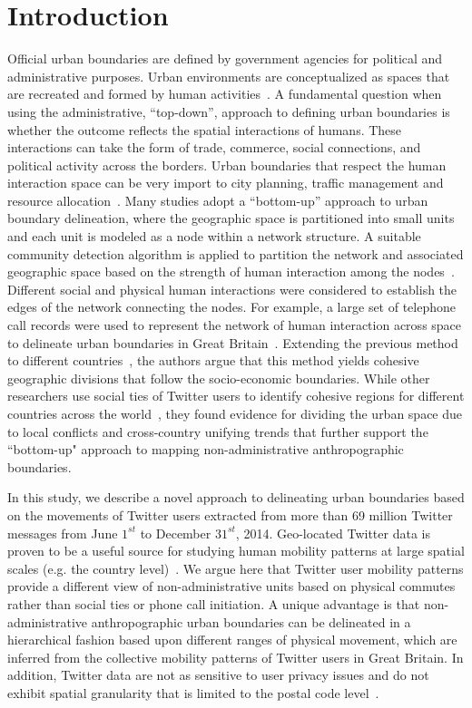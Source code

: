 \documentclass[10pt,letterpaper]{article}
\begin{document}
\section*{Introduction}
Official urban boundaries are defined by government agencies for political and administrative purposes.
Urban environments are conceptualized as spaces that are recreated and formed by human activities~\cite{schliephake}.
A fundamental question when using the administrative, ``top-down'', approach to defining urban boundaries is whether the outcome reflects the spatial interactions of humans.
These interactions can take the form of trade, commerce, social connections, and political activity across the borders.
Urban boundaries that respect the human interaction space can be very import to city planning, traffic management and resource allocation~\cite{lynch1960,jiang2015,liu2015,long2015}.
Many studies adopt a ``bottom-up'' approach to urban boundary delineation, where the geographic space is partitioned into small units and each unit is modeled as a node within a network structure.
A suitable community detection algorithm is applied to partition the network and associated geographic space based on the strength of human interaction among the nodes~\cite{lancichinetti2009}.
Different social and physical human interactions were considered to establish the edges of the network connecting the nodes.
For example, a large set of telephone call records were used to represent the network of human interaction across space to delineate urban boundaries in Great Britain~\cite{ratti2010}.
Extending the previous method to different countries~\cite{sobolevsky2013}, the authors argue that this method yields cohesive geographic divisions that follow the socio-economic boundaries.
While other researchers use social ties of Twitter users to identify cohesive regions for different countries across the world~\cite{kallus2015}, they found evidence for dividing the urban space due to local conflicts and cross-country unifying trends that further support the ``bottom-up" approach to mapping non-administrative anthropographic boundaries.

In this study, we describe a novel approach to delineating urban boundaries based on the movements of 
Twitter users extracted from more than 69 million Twitter messages from June $1^{st}$ to December $31^{st}$, 2014.
Geo-located Twitter data is proven to be a useful source for studying human mobility patterns at large spatial scales (e.g. the country level)~\cite{hawelka,jurdak2015}.
We argue here that Twitter user mobility patterns provide a different view of non-administrative units based on physical commutes rather than social ties or phone call initiation. 
A unique advantage is that non-administrative anthropographic urban boundaries can be delineated in a hierarchical fashion based upon different ranges of physical movement, which are inferred from the collective mobility patterns of Twitter users in Great Britain. 
In addition, Twitter data are not as sensitive to user privacy issues and do not exhibit spatial granularity that is limited to the postal code level~\cite{thiemann}. 
\end{document}
